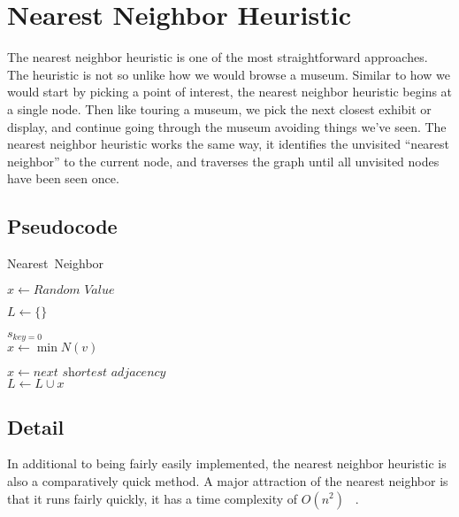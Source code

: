 \documentclass{article}
\author{Trent Louie, William Davies}
\begin{document}
\section{Nearest Neighbor Heuristic}

The nearest neighbor heuristic is one of the most straightforward approaches.
The heuristic is not so unlike how we would browse a museum. Similar to how we
would start by picking a point of interest, the nearest neighbor heuristic
begins at a single node. Then like touring a museum, we pick the next closest
exhibit or display, and continue going through the museum avoiding things we’ve
seen. The nearest neighbor heuristic works the same way, it identifies the
unvisited “nearest neighbor” to the current node, and traverses the graph until
all unvisited nodes have been seen once.

\subsection{Pseudocode}

\FloatBarrier

\begin{algorithm}
  \caption{Nearest\ Neighbor}
  \label{alg1}
  \begin{algorithmic}[1]

    \State $x \gets \textit{Random\ Value}$

    \State $L \gets \{\}$

    \State $s_{\textit{key} = 0}$
    \\
        \State $x \gets \min N(v)$

        \Else
          \State $x \gets \textit{next shortest adjacency}$
        \EndIf
      \EndFor
    \EndWhile
    \\
    \State $L \gets L \cup {x}$
    \EndProcedure
  \end{algorithmic}
\end{algorithm}

\FloatBarrier

\subsection{Detail}
In additional to being fairly easily implemented, the nearest neighbor heuristic
is also a comparatively quick method. A major attraction of the nearest neighbor
is that it runs fairly quickly, it has a time complexity of $O(n^2)$
~\cite{nilsson2003heuristics}.\\
\end{document}
